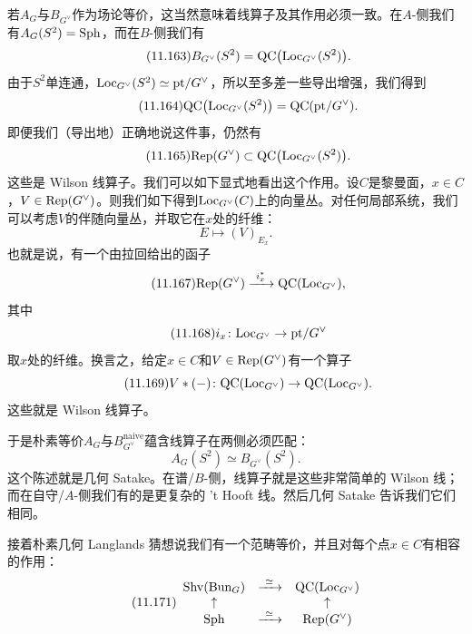 若$A_G$与$B_{G^{\vee}}$作为场论等价，这当然意味着线算子及其作用必须一致。在$A$-侧我们有$A_G(S^{2})=\mathrm{Sph}$，而在$B$-侧我们有
\begin{equation}\tag{11.163}
B_{G^{\vee}}(S^{2})=\mathrm{QC}\bigl(\mathrm{Loc}_{G^{\vee}}(S^{2})\bigr).
\end{equation}
由于$S^{2}$单连通，$\mathrm{Loc}_{G^{\vee}}(S^{2})\simeq\mathrm{pt}/G^{\vee}$，所以至多差一些导出增强，我们得到
\begin{equation}\tag{11.164}
\mathrm{QC}\bigl(\mathrm{Loc}_{G^{\vee}}(S^{2})\bigr)=\mathrm{QC}(\mathrm{pt}/G^{\vee}).
\end{equation}
即便我们（导出地）正确地说这件事，仍然有
\begin{equation}\tag{11.165}
\mathrm{Rep}(G^{\vee})\subset\mathrm{QC}\bigl(\mathrm{Loc}_{G^{\vee}}(S^{2})\bigr).
\end{equation}
这些是 Wilson 线算子。我们可以如下显式地看出这个作用。设$C$是黎曼面，$x\in C$，$V\in\mathrm{Rep}(G^{\vee})$。则我们如下得到$\mathrm{Loc}_{G^{\vee}}(C)$上的向量丛。对任何局部系统，我们可以考虑$V$的伴随向量丛，并取它在$x$处的纤维：
\begin{equation}\tag{11.166}
E\mapsto(V)_{E_x}.
\end{equation}
也就是说，有一个由拉回给出的函子
\begin{equation}\tag{11.167}
\mathrm{Rep}(G^{\vee})\xrightarrow{\ i_x^{*}\ }\mathrm{QC}(\mathrm{Loc}_{G^{\vee}}),
\end{equation}
其中
\begin{equation}\tag{11.168}
i_x\colon\mathrm{Loc}_{G^{\vee}}\to\mathrm{pt}/G^{\vee}
\end{equation}
取$x$处的纤维。换言之，给定$x\in C$和$V\in\mathrm{Rep}(G^{\vee})$有一个算子
\begin{equation}\tag{11.169}
V*(-)\colon\mathrm{QC}(\mathrm{Loc}_{G^{\vee}})\to\mathrm{QC}(\mathrm{Loc}_{G^{\vee}}).
\end{equation}
这些就是 Wilson 线算子。

于是朴素等价$A_G$与$B^{\mathrm{naive}}_{G^{\vee}}$蕴含线算子在两侧必须匹配：
\begin{equation}\tag{11.170}
A_G(S^{2})\simeq B_{G^{\vee}}(S^{2}).
\end{equation}
这个陈述就是几何 Satake。在谱/$B$-侧，线算子就是这些非常简单的 Wilson 线；而在自守/$A$-侧我们有的是更复杂的 't Hooft 线。然后几何 Satake 告诉我们它们相同。

接着朴素几何 Langlands 猜想说我们有一个范畴等价，并且对每个点$x\in C$有相容的作用：
\begin{equation}\tag{11.171}
\begin{array}{ccc}
\mathrm{Shv}(\mathrm{Bun}_G) & \xrightarrow{\ \simeq\ } & \mathrm{QC}(\mathrm{Loc}_{G^{\vee}})\\
\uparrow & & \uparrow\\
\mathrm{Sph} & \xrightarrow{\ \simeq\ } & \mathrm{Rep}(G^{\vee})
\end{array}
\end{equation}

